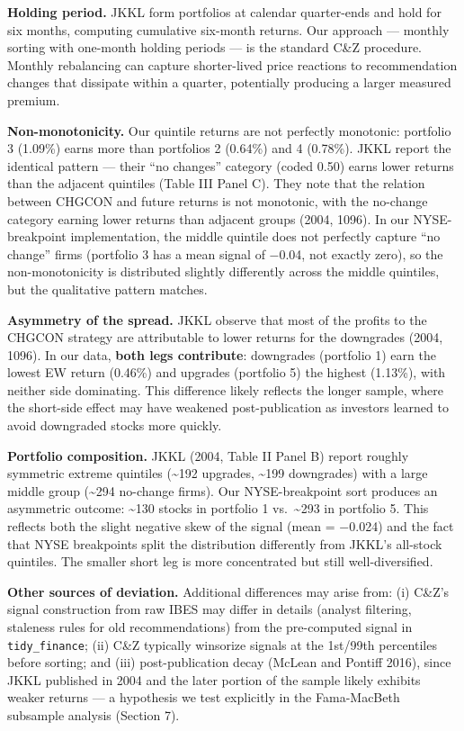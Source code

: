 \documentclass[
  letterpaper,
  DIV=11,
  numbers=noendperiod]{scrartcl}
\begin{document}
\textbf{Holding period.} JKKL form portfolios at calendar quarter-ends
and hold for six months, computing cumulative six-month returns. Our
approach --- monthly sorting with one-month holding periods --- is the
standard C\&Z procedure. Monthly rebalancing can capture shorter-lived
price reactions to recommendation changes that dissipate within a
quarter, potentially producing a larger measured premium.

\textbf{Non-monotonicity.} Our quintile returns are not perfectly
monotonic: portfolio 3 (1.09\%) earns more than portfolios 2 (0.64\%)
and 4 (0.78\%). JKKL report the identical pattern --- their ``no
changes'' category (coded 0.50) earns lower returns than the adjacent
quintiles (Table III Panel C). They note that the relation between
CHGCON and future returns is not monotonic, with the no-change category
earning lower returns than adjacent groups (2004, 1096). In our
NYSE-breakpoint implementation, the middle quintile does not perfectly
capture ``no change'' firms (portfolio 3 has a mean signal of −0.04, not
exactly zero), so the non-monotonicity is distributed slightly
differently across the middle quintiles, but the qualitative pattern
matches.

\textbf{Asymmetry of the spread.} JKKL observe that most of the profits
to the CHGCON strategy are attributable to lower returns for the
downgrades (2004, 1096). In our data, \textbf{both legs contribute}:
downgrades (portfolio 1) earn the lowest EW return (0.46\%) and upgrades
(portfolio 5) the highest (1.13\%), with neither side dominating. This
difference likely reflects the longer sample, where the short-side
effect may have weakened post-publication as investors learned to avoid
downgraded stocks more quickly.

\textbf{Portfolio composition.} JKKL (2004, Table II Panel B) report
roughly symmetric extreme quintiles (\textasciitilde192 upgrades,
\textasciitilde199 downgrades) with a large middle group
(\textasciitilde294 no-change firms). Our NYSE-breakpoint sort produces
an asymmetric outcome: \textasciitilde130 stocks in portfolio 1
vs.~\textasciitilde293 in portfolio 5. This reflects both the slight
negative skew of the signal (mean = −0.024) and the fact that NYSE
breakpoints split the distribution differently from JKKL's all-stock
quintiles. The smaller short leg is more concentrated but still
well-diversified.

\textbf{Other sources of deviation.} Additional differences may arise
from: (i) C\&Z's signal construction from raw IBES may differ in details
(analyst filtering, staleness rules for old recommendations) from the
pre-computed signal in \texttt{tidy\_finance}; (ii) C\&Z typically
winsorize signals at the 1st/99th percentiles before sorting; and (iii)
post-publication decay (McLean and Pontiff 2016), since JKKL published
in 2004 and the later portion of the sample likely exhibits weaker
returns --- a hypothesis we test explicitly in the Fama-MacBeth
subsample analysis (Section 7).
\end{document}
